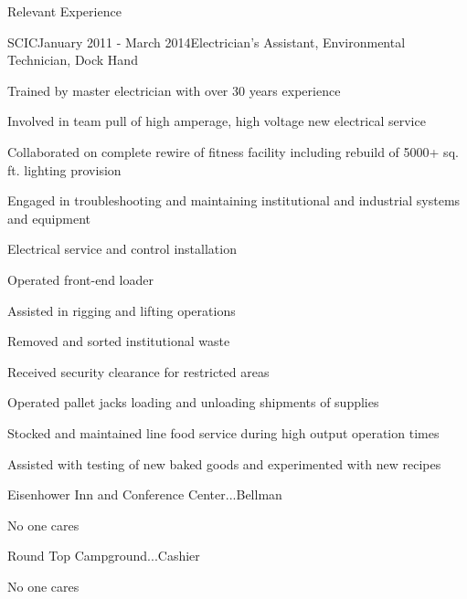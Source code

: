 \documentclass{resume} %
\begin{document}
\begin{rSection}{Relevant Experience}

\begin{rWorkSubsection}{SCIC}{January 2011 - March 2014}{Electrician's Assistant, Environmental Technician, Dock Hand}{}
\item Trained by master electrician with over 30 years experience
\item Involved in team pull of high amperage, high voltage new electrical service
\item Collaborated on complete rewire of fitness facility including rebuild of 5000+ sq. ft. lighting provision
\item Engaged in troubleshooting and maintaining institutional and industrial systems and equipment
\item Electrical service and control installation
\item Operated front-end loader
\item Assisted in rigging and lifting operations
\item Removed and sorted institutional waste
\item Received security clearance for restricted areas
\item Operated pallet jacks loading and unloading shipments of supplies
\item Stocked and maintained line food service during high output operation times
\item Assisted with testing of new baked goods and experimented with new recipes
\end{rWorkSubsection}


\begin{rWorkSubsection}{Eisenhower Inn and Conference Center}{...}{Bellman}{}
\item No one cares
\end{rWorkSubsection}


\begin{rWorkSubsection}{Round Top Campground}{...}{Cashier}{}
\item No one cares
\end{rWorkSubsection}
\fi
\end{rSection}

\end{document}
